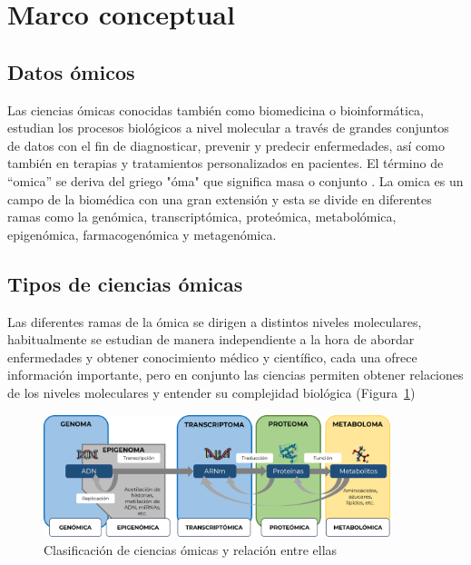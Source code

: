 \section{Marco conceptual}

\subsection{Datos ómicos}

Las ciencias ómicas conocidas también como biomedicina o bioinformática, estudian los procesos biológicos a nivel molecular a través de grandes conjuntos de datos con el fin de diagnosticar, prevenir y predecir enfermedades, así como también en terapias y tratamientos personalizados en pacientes. El término de “omica” se deriva del griego "óma" que significa masa o conjunto \citep{ravi2016deep,mamoshina2016applications}. La omica es un campo de la biomédica con una gran extensión y esta se divide en diferentes ramas como la genómica, transcriptómica, proteómica, metabolómica, epigenómica, farmacogenómica y metagenómica.

\subsection{Tipos de ciencias ómicas}

Las diferentes ramas de la ómica se dirigen a distintos niveles moleculares, habitualmente se estudian de manera independiente a la hora de abordar enfermedades y obtener conocimiento médico y científico, cada una ofrece información importante, pero en conjunto las ciencias permiten obtener relaciones de los niveles moleculares y entender su complejidad biológica (Figura~\ref{fig:tip_omic})

\begin{figure}[h!]
    \centering
    \includegraphics[width=0.9\textwidth]{Imagenes/Tip_omic.png}
    \caption{Clasificación de ciencias ómicas y relación entre ellas}
    \label{fig:tip_omic}
\end{figure}



